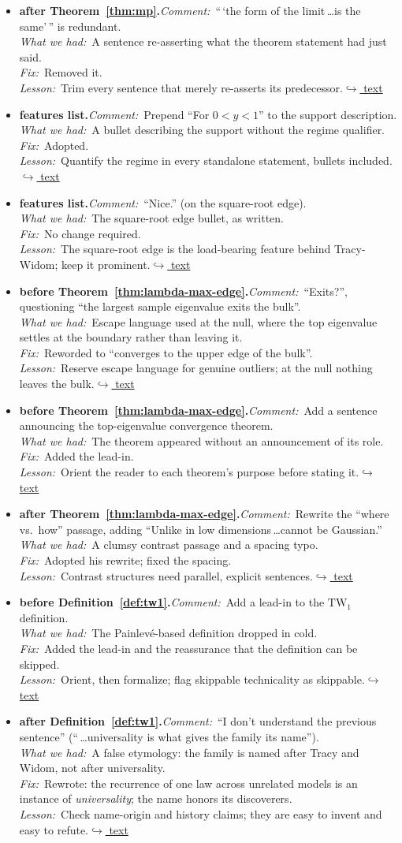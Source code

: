 \documentclass[12pt]{article}
\newcommand{\gdlogentry}[6]{%
  \item[\textcolor{thesisRev}{$\star$\,\ref{gdrev:#1}}]\hypertarget{gdlog:#1}{}%
  \textbf{#2.}\enspace\emph{Comment:}~#3\\
  \emph{What we had:}~#4\\
  \emph{Fix:}~#5\\
  \emph{Lesson:}~#6\enspace\hyperlink{gdtext:#1}{\textcolor{thesisLink}{$\hookrightarrow$ text}}}
\begin{document}
\begin{itemize}[leftmargin=2.4em,itemsep=0.55em]
\gdlogentry{mp-redundant}{after Theorem~\ref{thm:mp}}{``\,`the form of the limit\,\dots is the same'\,'' is redundant.}{A sentence re-asserting what the theorem statement had just said.}{Removed it.}{Trim every sentence that merely re-asserts its predecessor.}

\gdlogentry{support-range}{features list}{Prepend ``For \(0 < y < 1\)'' to the support description.}{A bullet describing the support without the regime qualifier.}{Adopted.}{Quantify the regime in every standalone statement, bullets included.}

\gdlogentry{nice}{features list}{``Nice.'' (on the square-root edge).}{The square-root edge bullet, as written.}{No change required.}{The square-root edge is the load-bearing feature behind Tracy-Widom; keep it prominent.}

\gdlogentry{exits}{before Theorem~\ref{thm:lambda-max-edge}}{``Exits?'', questioning ``the largest sample eigenvalue exits the bulk''.}{Escape language used at the null, where the top eigenvalue settles at the boundary rather than leaving it.}{Reworded to ``converges to the upper edge of the bulk''.}{Reserve escape language for genuine outliers; at the null nothing leaves the bulk.}

\gdlogentry{topeig-leadin}{before Theorem~\ref{thm:lambda-max-edge}}{Add a sentence announcing the top-eigenvalue convergence theorem.}{The theorem appeared without an announcement of its role.}{Added the lead-in.}{Orient the reader to each theorem's purpose before stating it.}

\gdlogentry{where-how}{after Theorem~\ref{thm:lambda-max-edge}}{Rewrite the ``where vs.\ how'' passage, adding ``Unlike in low dimensions\,\dots cannot be Gaussian.''}{A clumsy contrast passage and a spacing typo.}{Adopted his rewrite; fixed the spacing.}{Contrast structures need parallel, explicit sentences.}

\gdlogentry{tw1-leadin}{before Definition~\ref{def:tw1}}{Add a lead-in to the \(\mathrm{TW}_1\) definition.}{The Painlev\'e-based definition dropped in cold.}{Added the lead-in and the reassurance that the definition can be skipped.}{Orient, then formalize; flag skippable technicality as skippable.}

\gdlogentry{universality}{after Definition~\ref{def:tw1}}{``I don't understand the previous sentence'' (``\,\dots universality is what gives the family its name'').}{A false etymology: the family is named after Tracy and Widom, not after universality.}{Rewrote: the recurrence of one law across unrelated models is an instance of \emph{universality}; the name honors its discoverers.}{Check name-origin and history claims; they are easy to invent and easy to refute.}


\end{itemize}
\end{document}
